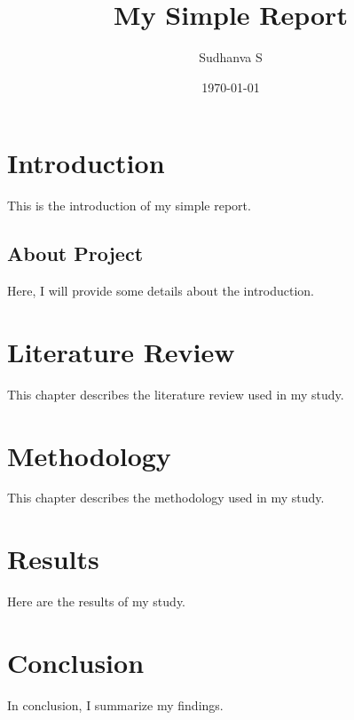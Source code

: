 \documentclass{report}
\title{My Simple Report}
\author{Sudhanva S}
\date{\today}
\begin{document}
\maketitle

\tableofcontents

\chapter{Introduction}
This is the introduction of my simple report.

\section{About Project}
Here, I will provide some details about the introduction.

\chapter{Literature Review}
This chapter describes the literature review used in my study.

\chapter{Methodology}
This chapter describes the methodology used in my study.

\chapter{Results}
Here are the results of my study.

\chapter{Conclusion}
In conclusion, I summarize my findings.
\end{document}
